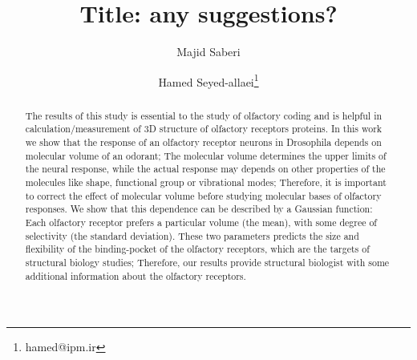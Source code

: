 \documentclass[11pt]{paper} %
\title{Title: any suggestions?}
\author{Majid Saberi \and Hamed Seyed-allaei\thanks{hamed@ipm.ir}}
\begin{document}
\maketitle

\begin{abstract}
	The results of this study is essential to the study of olfactory coding and is helpful in calculation/measurement of 3D structure of olfactory receptors proteins.
	In this work we show that the response of an olfactory receptor neurons in Drosophila depends on molecular volume of an odorant;  
	The molecular volume determines the upper limits of the neural response, 
	while the actual response may depends on other properties of the molecules like shape, functional group or vibrational modes; 
	Therefore, it is important to correct the effect of molecular volume before studying molecular bases of olfactory responses.
	We show that this dependence can be described by a Gaussian function: 
	Each olfactory receptor prefers a particular volume (the mean), with some degree of selectivity (the standard deviation). 
	These two parameters predicts the size and flexibility of the binding-pocket of the olfactory receptors, 
	which are the targets of structural biology studies; 
	Therefore, our results provide structural biologist with some additional information about the olfactory receptors. 
\end{abstract}
\end{document}
